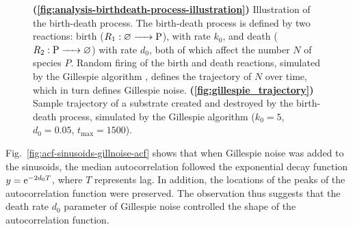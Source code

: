 \begin{figure}[p]
  \caption[
    Illustration of the birth-death process.
  ]{
    \textbf{(\ref{fig:analysis-birthdeath-process-illustration})}
    Illustration of the birth-death process.
    The birth-death process is defined by two reactions: birth ($R_{1}: \varnothing \ce{ -> P}$), with rate $k_{0}$, and death ($R_{2}: \ce{P -> } \varnothing$) with rate $d_{0}$, both of which affect the number $N$ of species $P$.
    Random firing of the birth and death reactions, simulated by the Gillespie algorithm \parencite{gillespieStochasticSimulationChemical2007}, defines the trajectory of $N$ over time, which in turn defines Gillespie noise.
    \textbf{(\ref{fig:gillespie_trajectory})}
    Sample trajectory of a substrate created and destroyed by the birth-death process, simulated by the Gillespie algorithm ($k_{0} = 5$, $d_{0} = 0.05$, $t_{\mathrm{max}} = 1500$).
  }
  \label{fig:analysis-birthdeath-process}
\end{figure}

Fig.\ \ref{fig:acf-sinusoids-gillnoise-acf} shows that when Gillespie noise was added to the sinusoids, the median autocorrelation followed the exponential decay function $y = \mathrm{e}^{-2d_{0}T}$, where $T$ represents lag.
In addition, the locations of the peaks of the autocorrelation function were preserved.
The observation thus suggests that the death rate $d_{0}$ parameter of Gillespie noise controlled the shape of the autocorrelation function.



